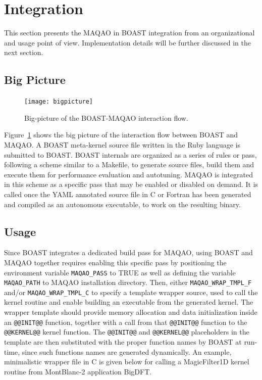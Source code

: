 \documentclass[11pt, a4paper, twoside]{montblanc2}
\begin{document}
\section{Integration}\label{sec:integration}

This section presents the MAQAO in BOAST integration from an organizational and usage point of view. 
Implementation details will be further discussed in the next section.

\subsection{Big Picture}
\begin{figure}[h]
  \centering
\texttt{[image: bigpicture]}
\caption{Big-picture of the BOAST-MAQAO interaction flow.}\label{fig:bigpict}
\end{figure}

Figure~\ref{fig:bigpict} shows the big picture of the interaction flow between BOAST and MAQAO. A 
BOAST meta-kernel source file written in the Ruby language is submitted to BOAST. BOAST internals 
are organized as a series of rules or pass, following a scheme similar to a Makefile, to generate 
source files, build them and execute them for performance evaluation and autotuning. MAQAO is 
integrated in this scheme as a specific pass that may be enabled or disabled on demand. It is called 
once the YAML annotated source file in C or Fortran has been generated and compiled as an autonomous 
executable, to work on the resulting binary.

\subsection{Usage}

Since BOAST integrates a dedicated build pass for MAQAO, using BOAST and MAQAO together requires 
enabling this specific pass by positioning the environment variable \verb|MAQAO_PASS| to TRUE as 
well as defining the variable \verb|MAQAO_PATH| to MAQAO installation directory. Then, either 
\verb|MAQAO_WRAP_TMPL_F| and/or \verb|MAQAO_WRAP_TMPL_C| to specify a template wrapper source, used 
to call the kernel routine and enable building an executable from the generated kernel. The wrapper 
template should provide memory allocation and data initialization inside an \verb|@@INIT@@| 
function, together with a call from that \verb|@@INIT@@| function to the \verb|@@KERNEL@@| kernel 
function. The \verb|@@INIT@@| and \verb|@@KERNEL@@| placeholders in the template are then 
substituted with the proper function names by BOAST at run-time, since such functions names are 
generated dynamically. An example, minimalistic wrapper file in C is given below for calling a 
MagicFilter1D kernel routine from MontBlanc-2 application BigDFT.
\end{document}
